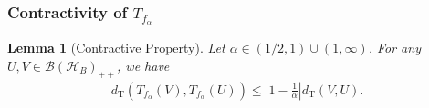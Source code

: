 \documentclass{article}
\newtheorem{lemma}[theorem]{Lemma}
\begin{document}
\subsubsection{Contractivity of $T_{f_{\alpha}}$}
\label{subsec:Contract}
\begin{lemma}[{Contractive Property}]
    \label{ineq:Contract}
    Let $\alpha\in(1/2,1)\cup(1,\infty)$. 
    For any $U,V\in\mathcal{B}\left(\mathcal{H}_B\right)_{++}$, we have
    \begin{align}
        d_{\mathrm{T}}\left(T_{f_{\alpha}}(V),T_{f_{\alpha}}(U)\right)
        \leq \left|1-\frac{1}{\alpha}\right| d_{\mathrm{T}}\left(V,U\right).
    \end{align}
\end{lemma}
\end{document}
